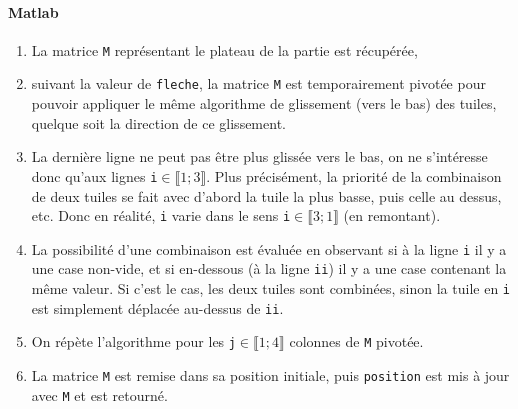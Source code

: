 \documentclass[a4paper]{report}
\begin{document}
\paragraph{Matlab}

\begin{enumerate}
\item La matrice \verb|M| représentant le plateau de la partie est récupérée,
\item suivant la valeur de \verb|fleche|, la matrice \verb|M| est temporairement pivotée pour pouvoir appliquer le même algorithme de glissement (vers le bas) des tuiles, quelque soit la direction de ce glissement.
\item La dernière ligne ne peut pas être plus glissée vers le bas, on ne s'intéresse donc qu'aux lignes \verb|i|$\in\llbracket1;3\rrbracket$. Plus précisément, la priorité de la combinaison de deux tuiles se fait avec d'abord la tuile la plus basse, puis celle au dessus, etc. Donc en réalité, \verb|i| varie dans le sens \verb|i|$\in\llbracket3;1\rrbracket$ (en remontant).
\item La possibilité d'une combinaison est évaluée en observant si à la ligne \verb|i| il y a une case non-vide, et si en-dessous (à la ligne \verb|ii|) il y a une case contenant la même valeur. Si c'est le cas, les deux tuiles sont combinées, sinon la tuile en \verb|i| est simplement déplacée au-dessus de \verb|ii|.
\item On répète l'algorithme pour les \verb|j|$\in\llbracket1;4\rrbracket$ colonnes de \verb|M| pivotée.
\item La matrice \verb|M| est remise dans sa position initiale, puis \verb|position| est mis à jour avec \verb|M| et est retourné.
\end{enumerate}
\end{document}

